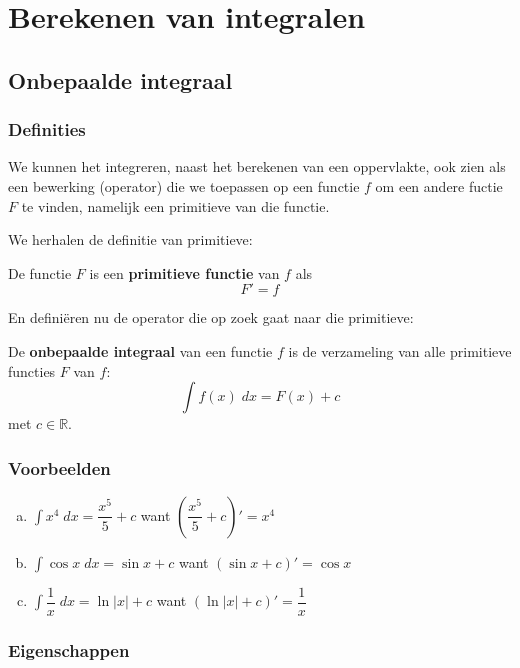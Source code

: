 \documentclass[a4paper,12pt, twoside]{article}
\begin{document}
\cleardoublepage
\section{Berekenen van integralen}

\subsection{Onbepaalde integraal}

\subsubsection*{Definities}

We kunnen het integreren, naast het berekenen van een oppervlakte, ook zien als een bewerking (operator) die we toepassen op een functie $f$ om een andere fuctie $F$ te vinden, namelijk een primitieve van die functie.

We herhalen de definitie van primitieve:
\begin{mdframed}
  De functie $F$ is een {\bf primitieve functie} van $f$ als
  $$F' = f$$
\end{mdframed}

En definiëren nu de operator die op zoek gaat naar die primitieve:
\begin{mdframed}
  De {\bf onbepaalde integraal} van een functie $f$ is de verzameling van alle primitieve functies $F$ van $f$:
  $$\int f(x)\;dx = F(x) + c$$
  met $c \in \mathbb{R}$.
\end{mdframed}

\subsubsection*{Voorbeelden}

\begin{enumerate}[(a)]
\item $\displaystyle \int x^4\;dx = \dfrac{x^5}{5} + c$ want $\displaystyle \left(\dfrac{x^5}{5} + c \right)' = x^4$
\item $\displaystyle \int \cos x\;dx = \sin x + c$ want $\displaystyle \left(\sin x + c \right)' = \cos x$
\item $\displaystyle \int \dfrac{1}{x} \;dx = \ln|x| + c$ want $\displaystyle \left(\ln|x| + c \right)' = \dfrac{1}{x}$
\end{enumerate}

\subsubsection*{Eigenschappen}
\end{document}
